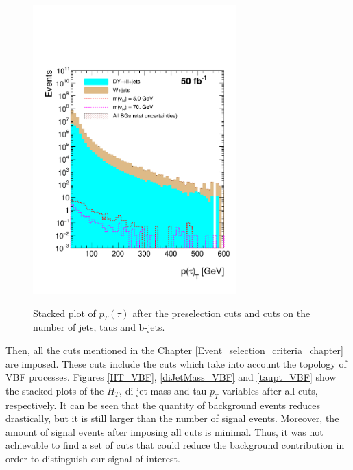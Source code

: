   \begin{figure}[h] 
 \centering
 \caption{Stacked plot of $p_T(\tau)$ after the preselection cuts and cuts on the number of jets, taus and b-jets.}
 \includegraphics[width=0.7\textwidth]{./Capitulos/Analysis/AfterBJets/TauPt_MET_20} 
 \label{taupt_bjets}
 \end{figure} 
 
 Then, all the cuts mentioned in the Chapter \ref{Event_selection_criteria_chapter} are imposed. 
 These cuts include the cuts which take into account the topology of VBF processes. Figures \ref{HT_VBF}, \ref{diJetMass_VBF} and \ref{taupt_VBF} show the stacked plots of the $H_T$, di-jet mass and tau $p_T$ variables after all cuts, respectively. It can be seen that the quantity of background events reduces drastically, but it is still larger than the number of signal events. Moreover, the amount of signal events after imposing all cuts is minimal. Thus, it was not achievable to find a set of cuts that could reduce the background contribution in order to distinguish our signal of interest.
  
